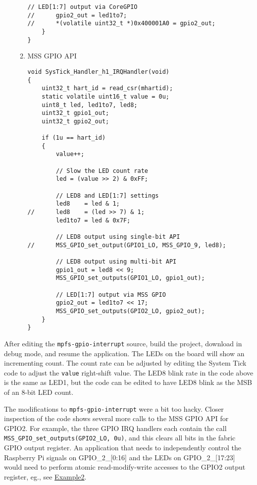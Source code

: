 \begin{enumerate}
\begin{enumerate}
\begin{lstlisting}[style=c]
        // LED[1:7] output via CoreGPIO
//      gpio2_out = led1to7;
//      *(volatile uint32_t *)0x400001A0 = gpio2_out;
    }
}
\end{lstlisting}
%
\item MSS GPIO API
\begin{lstlisting}[style=c]
void SysTick_Handler_h1_IRQHandler(void)
{
    uint32_t hart_id = read_csr(mhartid);
    static volatile uint16_t value = 0u;
    uint8_t led, led1to7, led8;
    uint32_t gpio1_out;
    uint32_t gpio2_out;

    if (1u == hart_id)
    {
        value++;

        // Slow the LED count rate
        led = (value >> 2) & 0xFF;

        // LED8 and LED[1:7] settings
        led8    = led & 1;
//      led8    = (led >> 7) & 1;
        led1to7 = led & 0x7F;

        // LED8 output using single-bit API
//      MSS_GPIO_set_output(GPIO1_LO, MSS_GPIO_9, led8);

        // LED8 output using multi-bit API
        gpio1_out = led8 << 9;
        MSS_GPIO_set_outputs(GPIO1_LO, gpio1_out);

        // LED[1:7] output via MSS GPIO
        gpio2_out = led1to7 << 17;
        MSS_GPIO_set_outputs(GPIO2_LO, gpio2_out);
    }
}
\end{lstlisting}
%
\end{enumerate}
\end{enumerate}
%
After editing the \texttt{mpfs-gpio-interrupt} source, build the project, download in debug mode,
and resume the application. The LEDs on the board will show an incrementing count. The count rate
can be adjusted by editing the System Tick code to adjust the \verb+value+ right-shift value.
The LED8 blink rate in the code above is the same as LED1, but the code can be edited to have
LED8 blink as the MSB of an 8-bit LED count.

The modifications to \texttt{mpfs-gpio-interrupt} were a bit too hacky. Closer inspection of the
code shows several more calls to the MSS GPIO API for GPIO2. For example, the three GPIO IRQ
handlers each contain the call
\verb+MSS_GPIO_set_outputs(GPIO2_LO, 0u)+, and this clears all
bits in the fabric GPIO output register. An application that needs to independently control
the Raspberry Pi signals on GPIO\_2\_[0:16] and the LEDs on GPIO\_2\_[17:23] would need to
perform atomic read-modify-write accesses to the GPIO2 output register, eg., see
\href{https://github.com/polarfire-soc/polarfire-soc-documentation/blob/master/bare-metal-embedded-software/bare-metal-driver-user-guides/polarfire-soc-mss-driver-user-guides/mss-gpio/mss-gpio-driver-user-guide.md#example2}
{Example2}.

